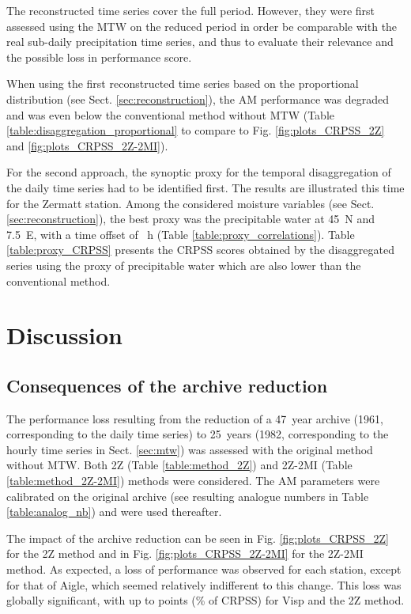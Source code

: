 \documentclass[hess, manuscript]{copernicus}
\begin{document}
	The reconstructed time series cover the full period. However, they were first assessed using the MTW on the reduced period in order be comparable with the real sub-daily precipitation time series, and thus to evaluate their relevance and the possible loss in performance score. 
	
	When using the first reconstructed time series based on the proportional distribution (see Sect. \ref{sec:reconstruction}), the AM performance was degraded and was even below the conventional method without MTW (Table \ref{table:disaggregation_proportional} to compare to Fig. \ref{fig:plots_CRPSS_2Z} and \ref{fig:plots_CRPSS_2Z-2MI}).
	
	For the second approach, the synoptic proxy for the temporal disaggregation of the daily time series had to be identified first. The results are illustrated this time for the Zermatt station. Among the considered moisture variables (see Sect. \ref{sec:reconstruction}), the best proxy was the precipitable water at 45\textdegree\ N and 7.5\textdegree\ E, with a time offset of ~h (Table \ref{table:proxy_correlations}). Table \ref{table:proxy_CRPSS} presents the CRPSS scores obtained by the disaggregated series using the proxy of precipitable water which are also lower than the conventional method.
	
	
	\section{Discussion}
	\label{sec:discussion}
	
	
		
	\subsection{Consequences of the archive reduction}
	\label{sec:archive_reduction}
	
	The performance loss resulting from the reduction of a 47~year archive (1961, corresponding to the daily time series) to 25~years (1982, corresponding to the hourly time series in Sect. \ref{sec:mtw}) was assessed with the original method without MTW. Both 2Z (Table \ref{table:method_2Z}) and 2Z-2MI (Table \ref{table:method_2Z-2MI}) methods were considered. The AM parameters were calibrated on the original archive (see resulting analogue numbers in Table \ref{table:analog_nb}) and were used thereafter.
	
	The impact of the archive reduction can be seen in Fig. \ref{fig:plots_CRPSS_2Z} for the 2Z method and in Fig. \ref{fig:plots_CRPSS_2Z-2MI} for the 2Z-2MI method. As expected, a loss of performance was observed for each station, except for that of Aigle, which seemed relatively indifferent to this change. This loss was globally significant, with up to  points (\% of CRPSS) for Visp and the 2Z method. 
	
\end{document}
